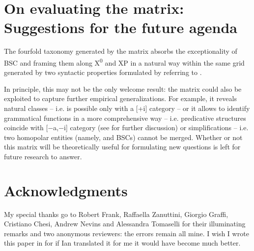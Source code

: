 \documentclass[output=paper]{langsci/langscibook}
\begin{document}
\section{On evaluating the matrix: Suggestions for the future agenda}

The fourfold taxonomy generated by the matrix absorbs the exceptionality of \gls{BSC}
and  framing them along X\textsuperscript{0} and XP in a natural way
within the same grid generated by two syntactic properties formulated by
referring to .

In principle, this may not be the only welcome result: the matrix could also be
exploited to capture further empirical generalizations. For example, it reveals
natural classes – i.e.  is possible only with a [+i] category – or it
allows to identify grammatical functions in a more comprehensive way – i.e.
predicative structures coincide with [−a,−i] category (see
\citealt{Moro2000,Moro2004} for further discussion) or simplifications – i.e.
two homopolar entities (namely,  and \glspl{BSC}) cannot be
merged. Whether or not this matrix will be theoretically useful for formulating
new questions is left for future research to answer.

\printchapterglossary{}

\section*{Acknowledgments}

My special thanks go to Robert Frank, Raffaella Zanuttini, Giorgio Graffi,
Cristiano Chesi, Andrew Nevins and Alessandra Tomaselli for their illuminating
remarks and two anonymous reviewers: the errors remain all mine. I wish I wrote
this paper in  for if Ian translated it for me it would have become much
better.\largerpage

{\sloppy\printbibliography[heading=subbibliography,notkeyword=this]}
\end{document}
